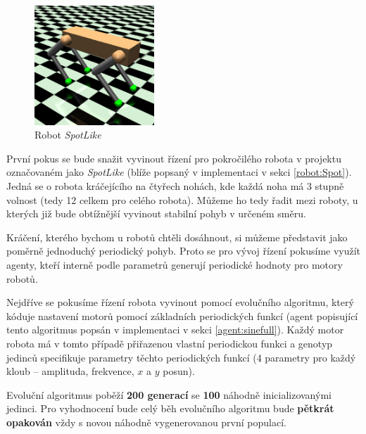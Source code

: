 \begin{figure}[!htb]
    \centering
    \includegraphics[width=0.4\textwidth]{../img/crop_SpotLike.jpg}
    \caption{Robot \emph{SpotLike}}
    \label{fig:robot:spotlike}
\end{figure}

První pokus se bude snažit vyvinout řízení pro pokročilého robota v projektu
označovaném jako \emph{SpotLike} (blíže popsaný v implementaci v sekci
\ref{robot:Spot}). Jedná se o robota kráčejícího na čtyřech nohách, kde každá
noha má 3 stupně volnost (tedy 12 celkem pro celého robota). Můžeme ho tedy
řadit mezi roboty, u kterých již bude obtížnější vyvinout stabilní pohyb v
určeném směru.

Kráčení, kterého bychom u robotů chtěli dosáhnout, si můžeme představit jako
poměrně jednoduchý periodický pohyb. Proto se pro vývoj řízení pokusíme využít
agenty, kteří interně podle parametrů generují periodické hodnoty pro motory
robotů. 

Nejdříve se pokusíme řízení robota vyvinout pomocí evolučního
algoritmu, který kóduje nastavení motorů pomocí základních periodických funkcí
(agent popisující tento algoritmus popsán v implementaci v sekci
\ref{agent:sinefull}). Každý motor robota má v tomto případě přiřazenou vlastní
periodickou funkci a genotyp jedinců specifikuje parametry těchto periodických
funkcí (4 parametry pro každý kloub -- amplituda, frekvence, $x$ a $y$ posun).

Evoluční algoritmus poběží \textbf{200 generací} se \textbf{100} náhodně
inicializovanými jedinci. Pro vyhodnocení bude celý běh evolučního algoritmu
bude \textbf{pětkrát opakován} vždy s novou náhodně vygenerovanou první populací.


